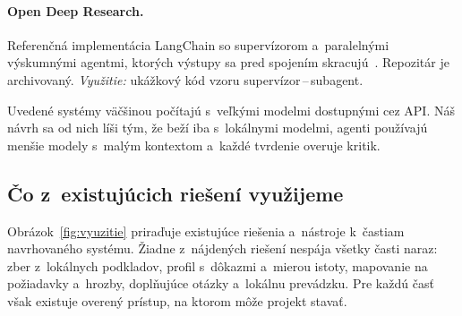 \paragraph{Open Deep Research.} Referenčná implementácia LangChain so
supervízorom a~paralelnými výskumnými agentmi, ktorých výstupy sa pred
spojením skracujú~\cite{open-deep-research}. Repozitár je archivovaný.
\emph{Využitie:} ukážkový kód vzoru supervízor\,--\,subagent.

Uvedené systémy väčšinou počítajú s~veľkými modelmi dostupnými cez API.
Náš návrh sa od nich líši tým, že beží iba s~lokálnymi modelmi, agenti
používajú menšie modely s~malým kontextom a~každé tvrdenie overuje kritik.

\subsection{Čo z~existujúcich riešení využijeme}
\label{sec:vyuzitie}

Obrázok~\ref{fig:vyuzitie} priraďuje existujúce riešenia a~nástroje
k~častiam navrhovaného systému. Žiadne z~nájdených riešení nespája všetky
časti naraz: zber z~lokálnych podkladov, profil s~dôkazmi a~mierou istoty,
mapovanie na požiadavky a~hrozby, doplňujúce otázky a~lokálnu prevádzku.
Pre každú časť však existuje overený prístup, na ktorom môže projekt
stavať.

